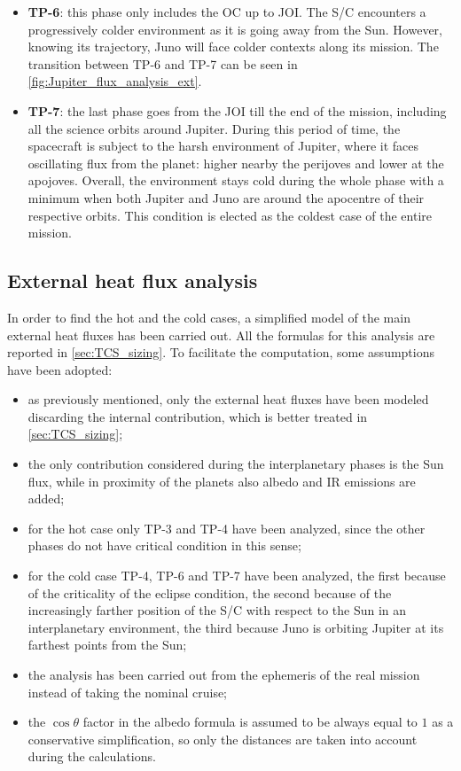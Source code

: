 \begin{itemize}
    \item \textbf{TP-6}:
    this phase only includes the OC up to JOI. The S/C encounters a progressively colder environment as it is going away from the Sun.
    However, knowing its trajectory, Juno will face colder contexts along its mission. The transition between TP-6 and TP-7 can be seen in \autoref{fig:Jupiter_flux_analysis_ext}.

    \item \textbf{TP-7}:
    the last phase goes from the JOI till the end of the mission, including all the science orbits around Jupiter.
    During this period of time, the spacecraft is subject to the harsh environment of Jupiter, where it faces oscillating flux from the planet: higher nearby the perijoves and lower at the apojoves.
    Overall, the environment stays cold during the whole phase with a minimum when both Jupiter and Juno are around the apocentre of their respective orbits. This condition is elected as the coldest case of the entire mission.
    
\end{itemize}


\subsection{External heat flux analysis}
\label{subsec:heat_flux_analysis}

In order to find the hot and the cold cases, a simplified model of the main external heat fluxes has been carried out. All the formulas for this analysis are reported in \autoref{sec:TCS_sizing}.
To facilitate the computation, some assumptions have been adopted:
\vspace*{2mm}
\begin{itemize}
    \item as previously mentioned, only the external heat fluxes have been modeled discarding the internal contribution, which is better treated in \autoref{sec:TCS_sizing};
    \item the only contribution considered during the interplanetary phases is the Sun flux, while in proximity of the planets also albedo and IR emissions are added;
    \item for the hot case only TP-3 and TP-4 have been analyzed, since the other phases do not have critical condition in this sense;
    \item for the cold case TP-4, TP-6 and TP-7 have been analyzed, the first because of the criticality of the eclipse condition, the second because of the increasingly farther position of the S/C with respect to the Sun in an interplanetary environment, the third because Juno is orbiting Jupiter at its farthest points from the Sun;
    \item the analysis has been carried out from the ephemeris of the real mission instead of taking the nominal cruise;
    \item the $\cos \theta$ factor in the albedo formula is assumed to be always equal to $1$ as a conservative simplification, so only the distances are taken into account during the calculations.

\end{itemize}

